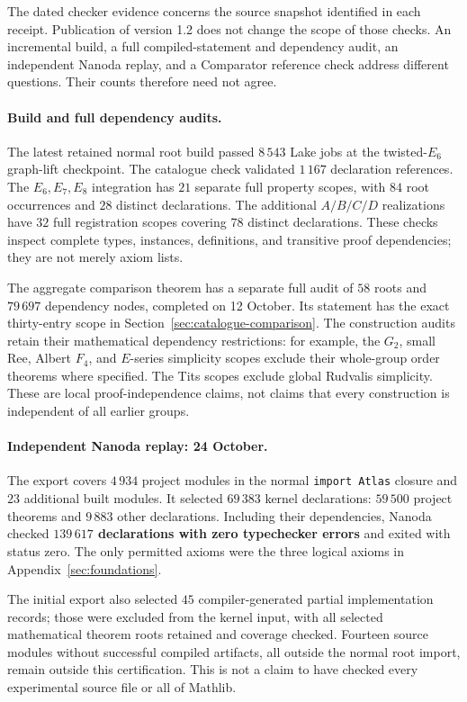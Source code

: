 \documentclass[11pt]{article}
\numberwithin{equation}{section}
\theoremstyle{definition}
\newcommand{\code}[1]{\texttt{\small #1}}
\begin{document}
The dated checker evidence concerns the source snapshot identified in each
receipt. Publication of version 1.2 does not change the scope of those checks. An incremental build, a full
compiled-statement and dependency audit, an independent Nanoda replay,
and a Comparator reference check address different questions. Their
counts therefore need not agree.

\paragraph{Build and full dependency audits.}
The latest retained normal root build passed $8\,543$ Lake jobs at the
twisted-$E_6$ graph-lift checkpoint. The catalogue check validated
$1\,167$ declaration references. The $E_6,E_7,E_8$ integration has
$21$ separate full property scopes, with $84$ root occurrences and
$28$ distinct declarations. The additional $A/B/C/D$ realizations have
$32$ full registration scopes covering $78$ distinct declarations.
These checks inspect complete types, instances, definitions, and
transitive proof dependencies; they are not merely axiom lists.

The aggregate comparison theorem has a separate full audit of
$58$ roots and $79\,697$ dependency nodes, completed on 12 October.
Its statement has the exact thirty-entry scope in
Section~\ref{sec:catalogue-comparison}. The construction audits retain
their mathematical dependency restrictions: for example, the $G_2$,
small Ree, Albert $F_4$, and $E$-series simplicity scopes exclude their
whole-group order theorems where specified. The Tits scopes exclude
global Rudvalis simplicity. These are local proof-independence claims,
not claims that every construction is independent of all earlier groups.

\paragraph{Independent Nanoda replay: 24 October.}
The export covers $4\,934$ project modules in the normal
\code{import Atlas} closure and $23$ additional built modules. It selected
$69\,383$ kernel declarations: $59\,500$ project theorems and $9\,883$
other declarations. Including their dependencies, Nanoda checked
\textbf{$139\,617$ declarations with zero typechecker errors} and exited
with status zero. The only permitted axioms were the three logical
axioms in Appendix~\ref{sec:foundations}.

The initial export also selected $45$ compiler-generated partial
implementation records; those were excluded from the kernel input,
with all selected mathematical theorem roots retained and coverage
checked. Fourteen source modules without successful compiled artifacts,
all outside the normal root import, remain outside this certification.
This is not a claim to have checked every experimental source file or
all of Mathlib.
\end{document}
